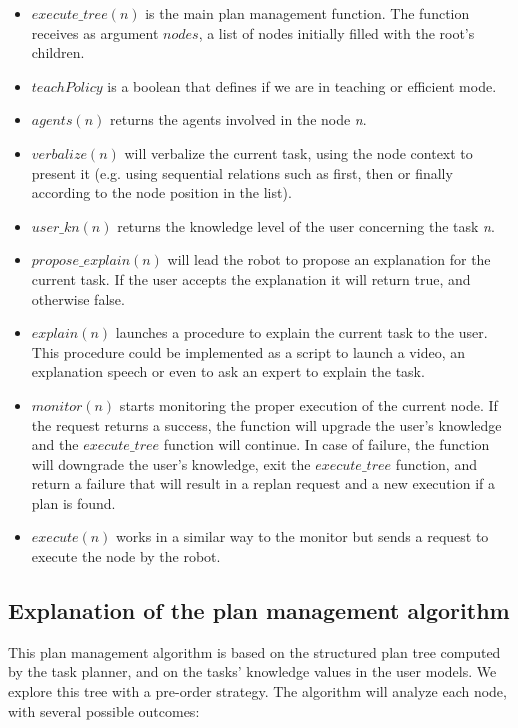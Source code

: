 \begin{itemize}
\item \textit{$execute\_tree(n)$} is the main plan management function. The function receives as argument \textit{$nodes$}, a list of nodes initially filled with the root's children.
\item \textit{$teachPolicy$} is a boolean that defines if we are in teaching or efficient mode.
\item \textit{$agents(n)$} returns the agents involved in the node \textit{n}.
\item \textit{$verbalize(n)$} will verbalize the current task, using the node context to present it (e.g. using sequential relations such as first, then or finally according to the node position in the list).
\item \textit{$user\_kn(n)$} returns the knowledge level of the user concerning the task \textit{n}.
\item \textit{$propose\_explain(n)$} will lead the robot to propose an explanation for the current task. If the user accepts the explanation it will return true, and otherwise false.
\item \textit{$explain(n)$} launches a procedure to explain the current task to the user. This procedure could be implemented as a script to launch a video, an explanation speech or even to ask an expert to explain the task.
\item \textit{$monitor(n)$} starts monitoring the proper execution of the current node. If the request returns a success, the function will upgrade the user's knowledge and the \textit{$execute\_tree$} function will continue. In case of failure, the function will downgrade the user's knowledge, exit the \textit{$execute\_tree$} function, and return a failure that will result in a replan request and a new execution if a plan is found.
\item \textit{$execute(n)$} works in a similar way to the monitor but sends a request to execute the node by the robot.
\end{itemize}
 
\subsection{Explanation of the plan management algorithm}
This plan management algorithm is based on the structured plan tree computed by the task planner, and on the tasks' knowledge values in the user models. We explore this tree with a pre-order strategy. The algorithm will analyze each node, with several possible outcomes:

